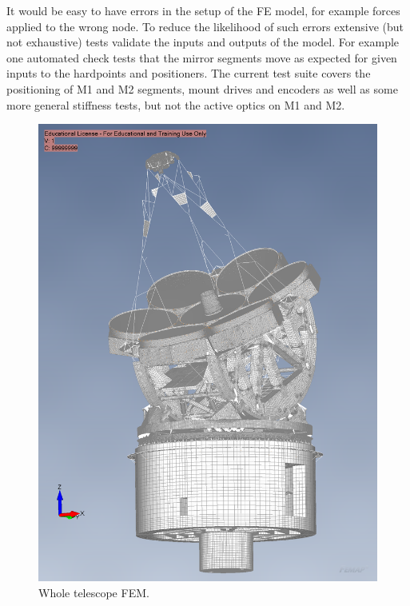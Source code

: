 It would be easy to have errors in the setup of the FE model, for example forces applied to the wrong node. 
To reduce the likelihood of such errors extensive (but not exhaustive) tests validate the inputs and outputs of the model. 
For example one automated check tests that the mirror segments move as expected for given inputs to the hardpoints and positioners.
The current test suite covers the positioning of M1 and M2 segments, mount
drives and encoders as well as some more general stiffness tests, but not the
active optics on M1 and M2.

\begin{figure}
  \centering
  \includegraphics[width=\textwidth]{FEM/whole_telescope.png}
  \caption{Whole telescope FEM.}
  \label{fig:fem-whole}
\end{figure}

